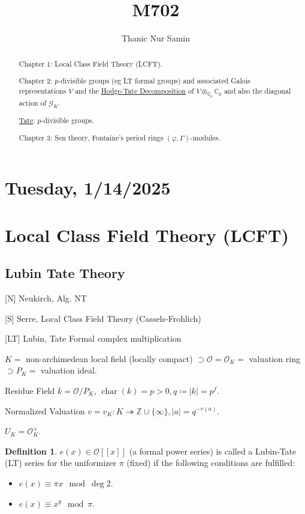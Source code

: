 \documentclass{article}
\title{M702}
\author{Thanic Nur Samin}
\date{\vspace{-5ex}}
\theoremstyle{definition}
\newtheorem*{definition}{Definition}
\numberwithin{theorem}{subsection}
\begin{document}
    \maketitle

    \section*{Tuesday, 1/14/2025}

    \begin{abstract}
        Chapter 1: Local Class Field Theory (LCFT).

        Chapter 2: \(p\)-divisible groups (eg LT formal groups) and associated Galois representations \(V\) and the \underline{Hodge-Tate Decomposition} of \(V \otimes_{\mathbb{Q}_p}\mathbb{C}_p\) and also the diagonal action of \(\mathscr{G}_K\).

        \underline{Tate}: \(p\)-divisible groups.

        Chapter 3: Sen theory, Fontaine's period rings \((\varphi, \Gamma)\)-modules.


    \end{abstract}
    
    \section{Local Class Field Theory (LCFT)}

    \subsection{Lubin Tate Theory}

    [N] Neukirch, Alg. NT
    
    [S] Serre, Local Class Field Theory (Cassels-Frohlich)

    [LT] Lubin, Tate Formal complex multiplication

    \(K =\)  non-archimedean local field (locally compact) \(\supset \mathcal{O} = \mathcal{O}_K =\) valuation ring \(\supset P_K =\) valuation ideal.

    Residue Field \(k = \mathcal{O} / P_K\), \(\operatorname{char} (k) = p > 0, q \coloneqq \vert k \vert = p^f\).

    Normalized Valuation \(v = v_K : K \twoheadrightarrow \mathbb{Z} \cup \{ \infty \}, \vert a \vert = q^{-v(a)}\).
    
    \(U_K = \mathcal{O}_K^\times\).

    \begin{definition}
        \(e(x) \in \mathcal{O} [[x]]\) (a formal power series) is called a Lubin-Tate (LT) series for the uniformizer \(\pi\) (fixed) if the following conditions are fulfilled:

        \begin{itemize}
            \item \(e(x) \equiv \pi x \mod\deg 2\).
            \item \(e(x) \equiv x^q \mod \pi\). 
        \end{itemize} 
    \end{definition}
\end{document}
